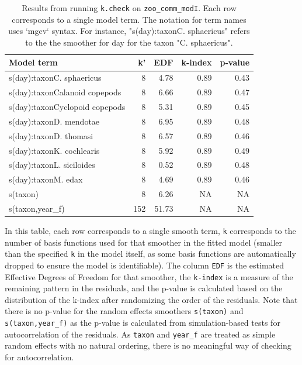 \documentclass[12pt]{article}
\begin{document}
\begin{table}[t]

\caption{\label{tab:zoo_comm_check_k_kable}Results from running \texttt{k.check} on \texttt{zoo\_comm\_modI}. Each row corresponds to a single model term. The notation for term names uses `mgcv` syntax. For instance, "s(day):taxonC. sphaericus" refers to the the smoother for day for the taxon "C. sphaericus".}
\centering
\begin{tabular}{lrrrr}
\toprule
Model term & k' & EDF & k-index & p-value\\
\midrule
s(day):taxonC. sphaericus & 8 & 4.78 & 0.89 & 0.43\\
s(day):taxonCalanoid copepods & 8 & 6.66 & 0.89 & 0.47\\
s(day):taxonCyclopoid copepods & 8 & 5.31 & 0.89 & 0.45\\
s(day):taxonD. mendotae & 8 & 6.95 & 0.89 & 0.48\\
s(day):taxonD. thomasi & 8 & 6.57 & 0.89 & 0.46\\
\addlinespace
s(day):taxonK. cochlearis & 8 & 5.92 & 0.89 & 0.49\\
s(day):taxonL. siciloides & 8 & 0.52 & 0.89 & 0.48\\
s(day):taxonM. edax & 8 & 4.69 & 0.89 & 0.46\\
s(taxon) & 8 & 6.26 & NA & NA\\
s(taxon,year\_f) & 152 & 51.73 & NA & NA\\
\bottomrule
\end{tabular}
\end{table}

In this table, each row corresponds to a single smooth term,
\texttt{k\textquotesingle{}} corresponds to the number of basis
functions used for that smoother in the fitted model (smaller than the
specified \texttt{k} in the model itself, as some basis functions are
automatically dropped to ensure the model is identifiable). The column
\texttt{EDF} is the estimated Effective Degrees of Freedom for that
smoother, the \texttt{k-index} is a measure of the remaining pattern in
the residuals, and the p-value is calculated based on the distribution
of the k-index after randomizing the order of the residuals. Note that
there is no p-value for the random effects smoothers \texttt{s(taxon)}
and \texttt{s(taxon,year\_f)} as the p-value is calculated from
simulation-based tests for autocorrelation of the residuals. As
\texttt{taxon} and \texttt{year\_f} are treated as simple random effects
with no natural ordering, there is no meaningful way of checking for
autocorrelation.
\end{document}
